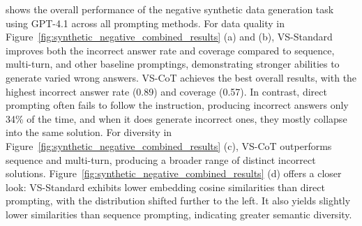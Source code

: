  shows the overall performance of the negative synthetic data generation task using GPT-4.1 across all prompting methods.
For data quality in Figure~\ref{fig:synthetic_negative_combined_results} (a) and (b), VS-Standard improves both the incorrect answer rate and coverage compared to sequence, multi-turn, and other baseline promptings, demonstrating stronger abilities to generate varied wrong answers. VS-CoT achieves the best overall results, with the highest incorrect answer rate (0.89) and coverage (0.57). In contrast, direct prompting often fails to follow the instruction, producing incorrect answers only 34\% of the time, and when it does generate incorrect ones, they mostly collapse into the same solution.
For diversity in Figure~\ref{fig:synthetic_negative_combined_results} (c), VS-CoT outperforms sequence and multi-turn, producing a broader range of distinct incorrect solutions. Figure~\ref{fig:synthetic_negative_combined_results} (d) offers a closer look: VS-Standard exhibits lower embedding cosine similarities than direct prompting, with the distribution shifted further to the left. It also yields slightly lower similarities than sequence prompting, indicating greater semantic diversity. %

